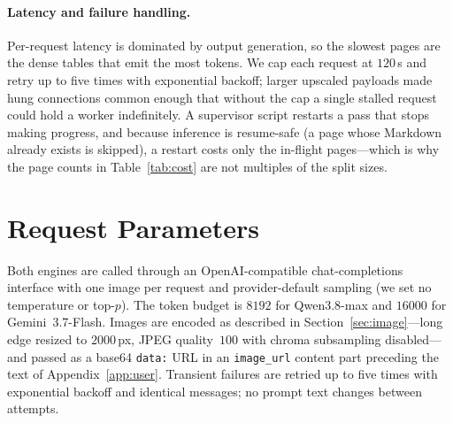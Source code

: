 \documentclass[11pt]{article}
\begin{document}
\paragraph{Latency and failure handling.} Per-request latency is dominated by output
generation, so the slowest pages are the dense tables that emit the most tokens. We
cap each request at $120$\,s and retry up to five times with exponential backoff;
larger upscaled payloads made hung connections common enough that without the cap a
single stalled request could hold a worker indefinitely. A supervisor script restarts
a pass that stops making progress, and because inference is resume-safe (a page whose
Markdown already exists is skipped), a restart costs only the in-flight pages---which
is why the page counts in Table~\ref{tab:cost} are not multiples of the split sizes.

\section{Request Parameters}
\label{app:params}
Both engines are called through an OpenAI-compatible chat-completions interface with
one image per request and provider-default sampling (we set no temperature or
top-$p$). The token budget is $8192$ for Qwen3.8-max and $16000$ for
Gemini~3.7-Flash. Images are encoded as described in Section~\ref{sec:image}---long
edge resized to $2000$\,px, JPEG quality~$100$ with chroma subsampling
disabled---and passed as a base64 \texttt{data:} URL in an \texttt{image\_url}
content part preceding the text of Appendix~\ref{app:user}. Transient failures are
retried up to five times with exponential backoff and identical messages; no prompt
text changes between attempts.
\end{document}
